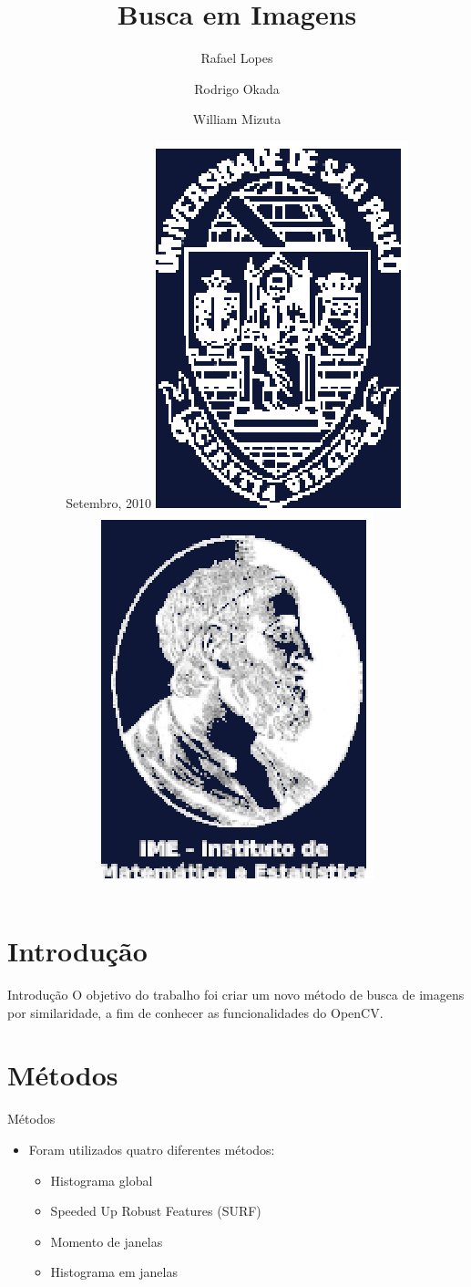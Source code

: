 \documentclass[
    style=paintings,
    paper=screen,
    blackslide,
    nopagebreaks,
    fleqn
]{powerdot}
\title{Busca em Imagens}
\author{Rafael Lopes \and Rodrigo Okada \and William Mizuta}
\date{
Setembro, 2010
\vfill
\includegraphics[height=.1\slidewidth ]{img/logo_usp_b.ps}
\includegraphics[height=.1\slidewidth ]{img/logo_ime_b.ps}
}
\begin{document}
\maketitle


\section[slide=false]{Introdução}
\begin{slide}{Introdução}
O objetivo do trabalho foi criar um novo método de busca de imagens por similaridade, 
a fim de conhecer as funcionalidades do OpenCV.
\end{slide}


\section[slide=false]{Métodos}
\begin{slide}{Métodos}
\begin{itemize}[type=1]
\item <1-> Foram utilizados quatro diferentes métodos:
\begin{itemize}[type=1]
\item <2-> Histograma global
\item <3-> Speeded Up Robust Features (SURF)
\item <4-> Momento de janelas
\item <5-> Histograma em janelas
\end{itemize}
\end{itemize}
\end{slide}
\end{document}
